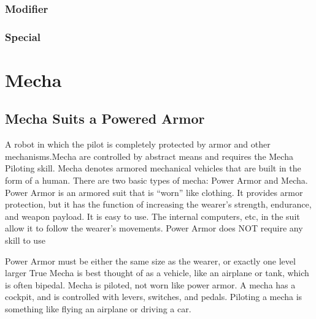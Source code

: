 \documentclass[twoside]{book}
\begin{document}
\subsection{Modifier}
    
\subsection{Special}
    
\chapter{Mecha}
    
\section{Mecha Suits a Powered Armor}
      A robot in which the pilot is completely protected by
             armor and other mechanisms.Mecha are controlled by abstract
             means and requires the Mecha Piloting skill.   Mecha denotes armored mechanical vehicles that are
             built in the form of a human. There are two basic types of
             mecha: Power Armor and Mecha.   Power Armor is an armored suit that is
             “worn” like clothing. It provides armor
             protection, but it has the function of increasing the
             wearer’s strength, endurance, and weapon payload. It
             is easy to use. The internal computers, etc, in the suit
             allow it to follow the wearer’s movements.   
               Power Armor does NOT require any skill to use
               
               Power Armor must be either the same size as the
               wearer, or exactly one level larger 
            True Mecha is best thought of as a vehicle, like an
             airplane or tank, which is often bipedal. Mecha is piloted,
             not worn like power armor. A mecha has a cockpit, and is
             controlled with levers, switches, and pedals. Piloting a
             mecha is something like flying an airplane or driving a car.
               
\end{document}
